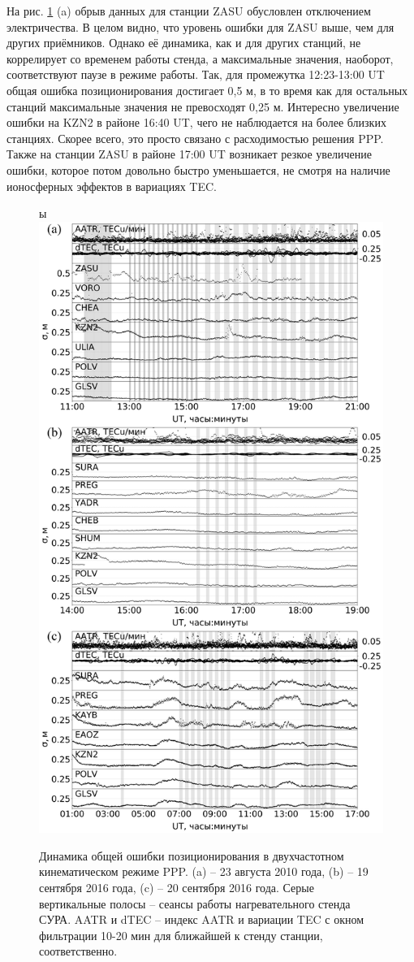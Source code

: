 На рис. \ref{fig-ppp-sura} (a) обрыв данных для станции ZASU обусловлен отключением электричества.
В целом видно, что уровень ошибки для ZASU выше, чем для других приёмников.
Однако её динамика, как и для других станций, не коррелирует со временем работы стенда, а максимальные значения, наоборот, соответствуют паузе в режиме работы.
Так, для промежутка 12:23-13:00 UT общая ошибка позиционирования достигает 0,5 м, в то время как для остальных станций максимальные значения не превосходят 0,25 м.
Интересно увеличение ошибки на KZN2 в районе 16:40 UT, чего не наблюдается на более близких станциях.
Скорее всего, это просто связано с расходимостью решения PPP.
Также на станции ZASU в районе 17:00 UT возникает резкое увеличение ошибки, которое потом довольно быстро уменьшается, не смотря на наличие ионосферных эффектов в вариациях TEC.
\begin{figure}[h]
\centering    ы
\includegraphics[width=0.75\linewidth]{fig/ppp-sura.png}    
\caption{Динамика общей ошибки позиционирования в двухчастотном кинематическом режиме PPP. (a) -- 23 августа 2010 года, (b) -- 19 сентября 2016 года, (c) -- 20 сентября 2016 года. Серые вертикальные полосы -- сеансы работы нагревательного стенда СУРА. AATR и dTEC -- индекс AATR и вариации TEC с окном фильтрации 10-20 мин для ближайшей к стенду станции, соответственно.}
\label{fig-ppp-sura}      
\end{figure} 
\clearpage

